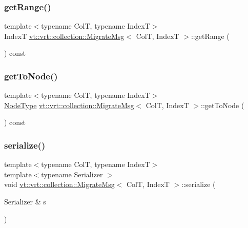 \subsubsection{\texorpdfstring{get\+Range()}{getRange()}}
{\footnotesize\ttfamily template$<$typename ColT, typename IndexT$>$ \\
IndexT \hyperlink{structvt_1_1vrt_1_1collection_1_1_migrate_msg}{vt\+::vrt\+::collection\+::\+Migrate\+Msg}$<$ ColT, IndexT $>$\+::get\+Range (\begin{DoxyParamCaption}{ }\end{DoxyParamCaption}) const\hspace{0.3cm}{\ttfamily [inline]}}

\mbox{\label{structvt_1_1vrt_1_1collection_1_1_migrate_msg_a24d93f9c73876f57d51a83f53a6e6796}} 
\subsubsection{\texorpdfstring{get\+To\+Node()}{getToNode()}}
{\footnotesize\ttfamily template$<$typename ColT, typename IndexT$>$ \\
\hyperlink{namespacevt_a866da9d0efc19c0a1ce79e9e492f47e2}{Node\+Type} \hyperlink{structvt_1_1vrt_1_1collection_1_1_migrate_msg}{vt\+::vrt\+::collection\+::\+Migrate\+Msg}$<$ ColT, IndexT $>$\+::get\+To\+Node (\begin{DoxyParamCaption}{ }\end{DoxyParamCaption}) const\hspace{0.3cm}{\ttfamily [inline]}}

\mbox{\label{structvt_1_1vrt_1_1collection_1_1_migrate_msg_afd275449bca23638c2d8139fff35d39f}} 
\subsubsection{\texorpdfstring{serialize()}{serialize()}}
{\footnotesize\ttfamily template$<$typename ColT, typename IndexT$>$ \\
template$<$typename Serializer $>$ \\
void \hyperlink{structvt_1_1vrt_1_1collection_1_1_migrate_msg}{vt\+::vrt\+::collection\+::\+Migrate\+Msg}$<$ ColT, IndexT $>$\+::serialize (\begin{DoxyParamCaption}\item[{Serializer \&}]{s }\end{DoxyParamCaption})\hspace{0.3cm}{\ttfamily [inline]}}

